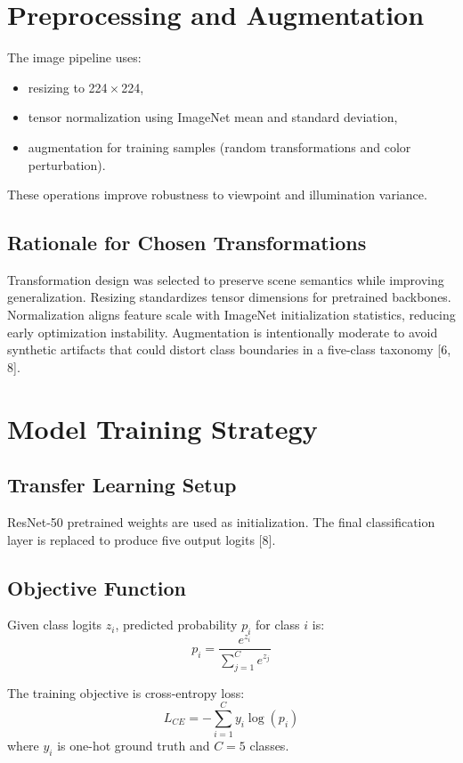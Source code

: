 \section{Preprocessing and Augmentation}
The image pipeline uses:
\begin{itemize}
\item resizing to 224\,$\times$\,224,
\item tensor normalization using ImageNet mean and standard deviation,
\item augmentation for training samples (random transformations and color perturbation).
\end{itemize}

These operations improve robustness to viewpoint and illumination variance.

\subsection{Rationale for Chosen Transformations}
Transformation design was selected to preserve scene semantics while improving generalization. Resizing standardizes tensor dimensions for pretrained backbones. Normalization aligns feature scale with ImageNet initialization statistics, reducing early optimization instability. Augmentation is intentionally moderate to avoid synthetic artifacts that could distort class boundaries in a five-class taxonomy [6, 8].

\section{Model Training Strategy}
\subsection{Transfer Learning Setup}
ResNet-50 pretrained weights are used as initialization. The final classification layer is replaced to produce five output logits [8].

\subsection{Objective Function}
Given class logits $z_i$, predicted probability $p_i$ for class $i$ is:
\begin{equation}
p_i = \frac{e^{z_i}}{\sum_{j=1}^{C} e^{z_j}}
\end{equation}

The training objective is cross-entropy loss:
\begin{equation}
L_{CE} = -\sum_{i=1}^{C} y_i \log(p_i)
\end{equation}
where $y_i$ is one-hot ground truth and $C=5$ classes.


